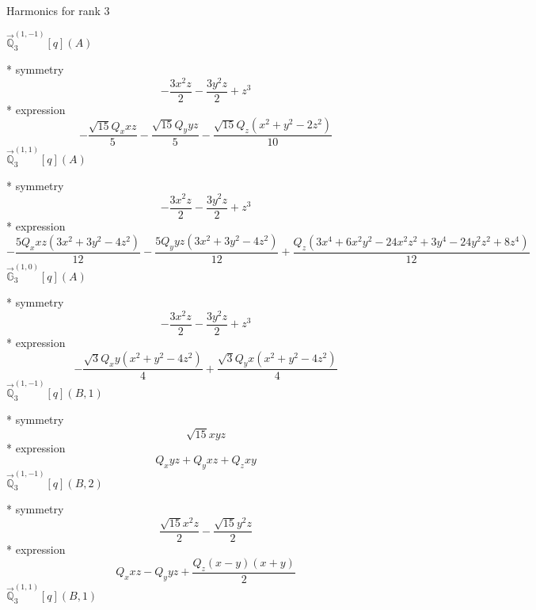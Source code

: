 \documentclass[fleqn,8pt]{jsarticle}
\begin{document}
\noindent * Harmonics for rank 3

\noindent\quad $\vec{\mathbb{Q}}_{3}^{(1,-1)}[q](A)$

\noindent\quad ** symmetry
\begin{dmath*}
- \frac{3 x^{2} z}{2} - \frac{3 y^{2} z}{2} + z^{3}
\end{dmath*}
\noindent\quad ** expression
\begin{dmath*}
- \frac{\sqrt{15} Q_{x} x z}{5} - \frac{\sqrt{15} Q_{y} y z}{5} - \frac{\sqrt{15} Q_{z} \left(x^{2} + y^{2} - 2 z^{2}\right)}{10}
\end{dmath*}
\noindent\quad $\vec{\mathbb{Q}}_{3}^{(1,1)}[q](A)$

\noindent\quad ** symmetry
\begin{dmath*}
- \frac{3 x^{2} z}{2} - \frac{3 y^{2} z}{2} + z^{3}
\end{dmath*}
\noindent\quad ** expression
\begin{dmath*}
- \frac{5 Q_{x} x z \left(3 x^{2} + 3 y^{2} - 4 z^{2}\right)}{12} - \frac{5 Q_{y} y z \left(3 x^{2} + 3 y^{2} - 4 z^{2}\right)}{12} + \frac{Q_{z} \left(3 x^{4} + 6 x^{2} y^{2} - 24 x^{2} z^{2} + 3 y^{4} - 24 y^{2} z^{2} + 8 z^{4}\right)}{12}
\end{dmath*}
\noindent\quad $\vec{\mathbb{G}}_{3}^{(1,0)}[q](A)$

\noindent\quad ** symmetry
\begin{dmath*}
- \frac{3 x^{2} z}{2} - \frac{3 y^{2} z}{2} + z^{3}
\end{dmath*}
\noindent\quad ** expression
\begin{dmath*}
- \frac{\sqrt{3} Q_{x} y \left(x^{2} + y^{2} - 4 z^{2}\right)}{4} + \frac{\sqrt{3} Q_{y} x \left(x^{2} + y^{2} - 4 z^{2}\right)}{4}
\end{dmath*}
\noindent\quad $\vec{\mathbb{Q}}_{3}^{(1,-1)}[q](B,1)$

\noindent\quad ** symmetry
\begin{dmath*}
\sqrt{15} x y z
\end{dmath*}
\noindent\quad ** expression
\begin{dmath*}
Q_{x} y z + Q_{y} x z + Q_{z} x y
\end{dmath*}
\noindent\quad $\vec{\mathbb{Q}}_{3}^{(1,-1)}[q](B,2)$

\noindent\quad ** symmetry
\begin{dmath*}
\frac{\sqrt{15} x^{2} z}{2} - \frac{\sqrt{15} y^{2} z}{2}
\end{dmath*}
\noindent\quad ** expression
\begin{dmath*}
Q_{x} x z - Q_{y} y z + \frac{Q_{z} \left(x - y\right) \left(x + y\right)}{2}
\end{dmath*}
\noindent\quad $\vec{\mathbb{Q}}_{3}^{(1,1)}[q](B,1)$
\end{document}
